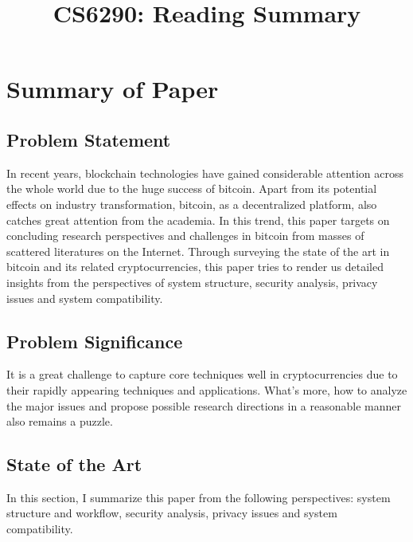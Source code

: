 \documentclass[conference]{IEEEtran}
\begin{document}
\title{CS6290: Reading Summary}

\author{
}

\maketitle

\section{Summary of Paper\cite{bonneau2015sok}}

\subsection{Problem Statement}
In recent years, blockchain technologies have gained considerable attention across the whole world due to the huge success of bitcoin. 
%
Apart from its potential effects on industry transformation, bitcoin, as a decentralized platform, also catches great attention from the academia.
%
In this trend, this paper\cite{bonneau2015sok} targets on concluding research perspectives and challenges in bitcoin from masses of scattered literatures on the Internet.
%
Through surveying the state of the art in bitcoin and its related cryptocurrencies, this paper tries to render us detailed insights from the perspectives of system structure, security analysis, privacy issues and system compatibility.

\subsection{Problem Significance}
It is a great challenge to capture core techniques well in cryptocurrencies due to their rapidly appearing techniques and applications.
%
What's more, how to analyze the major issues and propose possible research directions in a reasonable manner also remains a puzzle.


\subsection{State of the Art}
In this section, I summarize this paper from the following perspectives: system structure and workflow, security analysis, privacy issues and system compatibility.
\end{document}

